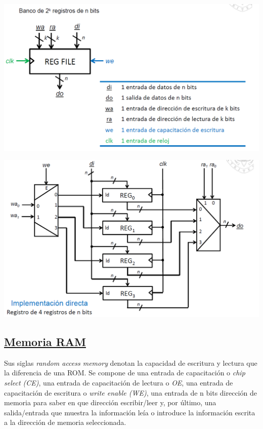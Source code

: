 \documentclass[a4paper,10pt]{book}
\begin{document}
\begin{center}
\includegraphics[scale=0.42]{banco de registros}
\end{center}

\begin{center}
\includegraphics[scale=0.42]{implementacion banco de registros}
\end{center}

\subsection*{\underline{Memoria RAM}}
Sus siglas \textit{random access memory} denotan la capacidad de escritura y lectura que la diferencia de una ROM. Se compone de una entrada de capacitación o \textit{chip select (CE)}, una entrada de capacitación de lectura o \textit{OE}, una entrada de capacitación de escritura o \textit{write enable (WE)}, una entrada de n bits dirección de memoria para saber en que dirección escribir/leer y, por último, una salida/entrada que muestra la información leía o introduce la información escrita a la dirección de memoria seleccionada.
\end{document}

